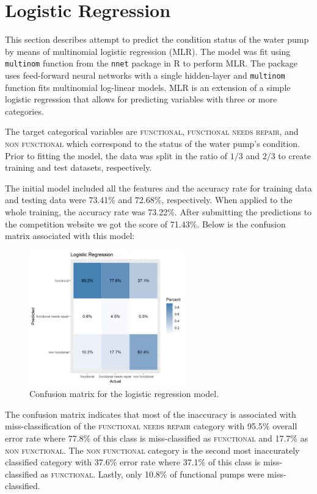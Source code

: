 \section{Logistic Regression} \label{logistic}
This section describes attempt to predict the condition status of the water pump by means of multinomial logistic regression (MLR). The model was fit using \texttt{multinom} function from the \texttt{nnet} package in R to perform MLR. The package uses feed-forward neural networks with a single hidden-layer and \texttt{multinom} function fits multinomial log-linear models. MLR is an extension of a simple logistic regression that allows for predicting variables with three or more categories. 

The target categorical variables are \textsc{functional, functional needs repair,} and \textsc{non functional} which correspond to the status of the water pump's condition. Prior to fitting the model, the data was split in the ratio of $1/3$ and $2/3$ to create training and test datasets, respectively. 

The initial model included all the features and the accuracy rate for training data and testing data were 73.41$\%$ and 72.68$\%$, respectively. When applied to the whole training, the accuracy rate was 73.22$\%$. After submitting the predictions to the competition website we got the score of 71.43$\%$. Below is the confusion matrix associated with this model:

\begin{figure}[h]
    \centering
    \includegraphics[width=0.6\textwidth]{Figures/LogConfMatrix.png}
    \caption{Confusion matrix for the logistic regression model.}
    \label{fig:NonNormalHists}
\end{figure}

The confusion matrix indicates that most of the inaccuracy is associated with miss-classification of the \textsc{functional needs repair} category with 95.5$\%$ overall error rate where 77.8$\%$ of this class is miss-classified as \textsc{functional} and 17.7$\%$ as \textsc{non functional}. The \textsc{non functional} category is the second most inaccurately classified category with 37.6$\%$ error rate where 37.1$\%$ of this class is miss-classified as \textsc{functional}. Lastly, only 10.8$\%$ of functional pumps were miss-classified. 

